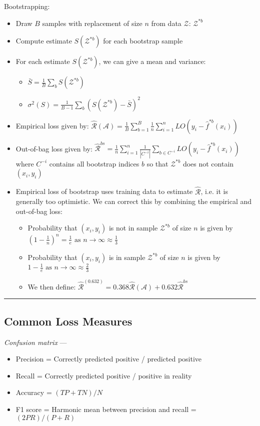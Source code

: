 Bootstrapping:
\begin{itemize}
    \item Draw $B$ samples with replacement of size $n$ from data $\mathcal{Z}$: $\mathcal{Z}^{*b}$
    \item Compute estimate $S( \mathcal{Z}^{*b} )$ for each bootstrap sample
    \item For each estimate $S( \mathcal{Z}^{*b} )$, we can give a mean and variance:
    \begin{itemize}
        \item $\bar{S} = \frac{1}{B} \sum_b S( \mathcal{Z}^{*b} )$
        \item $\sigma^2(S) = \frac{1}{B-1} \sum_b ( S( \mathcal{Z}^{*b} ) - \bar{S})^2$
    \end{itemize}
    \item Empirical loss given by: $\hat{\mathcal{R}}(\mathcal{A}) = \frac{1}{B} \sum_{b=1}^B \frac{1}{n} \sum_{i=1}^n LO(y_i - \hat{f}^{*b} (x_i))$ 
    \item Out-of-bag loss given by: $\hat{\mathcal{R}}^{bs} = \frac{1}{n} \sum_{i=1}^n \frac{1}{| C^{-i} |} \sum_{b \in C^{-i}} LO(y_i - \hat{f}^{*b} (x_i))$ where $C^{-i}$ contains all bootstrap indices $b$ so that $\mathcal{Z}^{*b}$ does not contain $(x_i,y_i)$
    \item Empirical loss of bootstrap uses training data to estimate $\hat{\mathcal{R}}$, i.e. it is generally too optimistic. We can correct this by combining the empirical and out-of-bag loss:
    \begin{itemize}
        \item Probability that $(x_i,y_i)$ is not in sample $\mathcal{Z}^{*b}$ of size $n$ is given by $(1-\frac{1}{n})^n = \frac{1}{e} \textrm{ as } n \rightarrow \infty \approx \frac{1}{3}$
        \item Probability that $(x_i,y_i)$ is in sample $\mathcal{Z}^{*b}$ of size $n$ is given by $1 - \frac{1}{e} \textrm{ as } n \rightarrow \infty \approx \frac{2}{3}$
        \item We then define: $\hat{\mathcal{R}}^{(0.632)} = 0.368 \hat{\mathcal{R}}(\mathcal{A}) + 0.632 \hat{\mathcal{R}}^{bs}$
    \end{itemize}
\end{itemize}

{\color{black}\hrule height 0.001mm}

\subsection*{Common Loss Measures}
\emph{Confusion matrix} --- 
\begin{itemize}
    \item Precision = Correctly predicted positive / predicted positive
    \item Recall = Correctly predicted positive / positive in reality
    \item Accuracy = $(TP + TN) / N$
    \item F1 score = Harmonic mean between precision and recall = $(2PR)/(P+R)$
\end{itemize}

